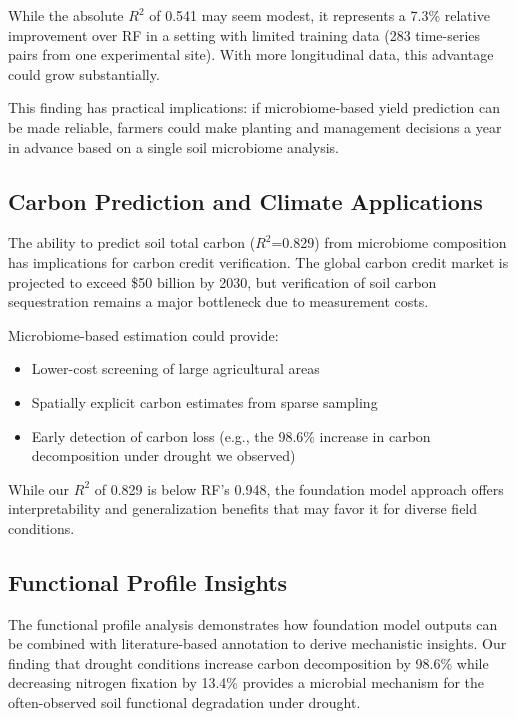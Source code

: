\documentclass[11pt,a4paper]{article}
\begin{document}
While the absolute $R^2$ of 0.541 may seem modest, it represents a 7.3\% relative improvement over RF in a setting with limited training data (283 time-series pairs from one experimental site). With more longitudinal data, this advantage could grow substantially.

This finding has practical implications: if microbiome-based yield prediction can be made reliable, farmers could make planting and management decisions a year in advance based on a single soil microbiome analysis.

\subsection{Carbon Prediction and Climate Applications}

The ability to predict soil total carbon ($R^2$=0.829) from microbiome composition has implications for carbon credit verification. The global carbon credit market is projected to exceed \$50 billion by 2030, but verification of soil carbon sequestration remains a major bottleneck due to measurement costs.

Microbiome-based estimation could provide:
\begin{itemize}[leftmargin=1.5em]
    \item Lower-cost screening of large agricultural areas
    \item Spatially explicit carbon estimates from sparse sampling
    \item Early detection of carbon loss (e.g., the 98.6\% increase in carbon decomposition under drought we observed)
\end{itemize}

While our $R^2$ of 0.829 is below RF's 0.948, the foundation model approach offers interpretability and generalization benefits that may favor it for diverse field conditions.

\subsection{Functional Profile Insights}

The functional profile analysis demonstrates how foundation model outputs can be combined with literature-based annotation to derive mechanistic insights. Our finding that drought conditions increase carbon decomposition by 98.6\% while decreasing nitrogen fixation by 13.4\% provides a microbial mechanism for the often-observed soil functional degradation under drought.
\end{document}
